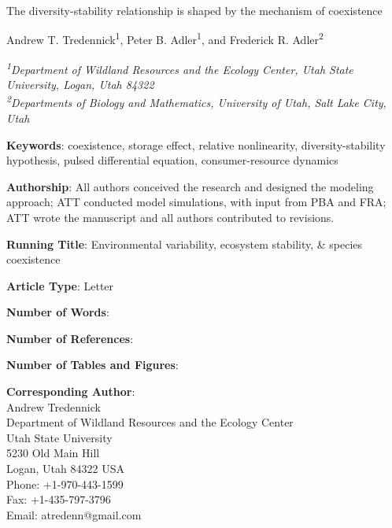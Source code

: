 \documentclass[12pt,]{article}
\title{}
\author{}
\date{}
\begin{document}
\maketitle


\renewcommand\linenumberfont{\normalfont\tiny\sffamily\color{gray}}

\begin{singlespace}

\begin{centering}

\Large{The diversity-stability relationship is shaped by the mechanism of coexistence}

\vspace{2.5em}

\renewcommand*{\thefootnote}{\fnsymbol{footnote}}

\normalsize{Andrew T. Tredennick\textsuperscript{1}, Peter B. Adler\textsuperscript{1}, and Frederick R. Adler\textsuperscript{2}}

\vspace{1.5em}

\textit{\small{\textsuperscript{1}Department of Wildland Resources and the Ecology Center, Utah State University, Logan, Utah 84322}} \\
\textit{\small{\textsuperscript{2}Departments of Biology and Mathematics, University of Utah, Salt Lake City, Utah}} 

\end{centering}

\vspace{3em}

\noindent \textbf{Keywords}: coexistence, storage effect, relative nonlinearity, diversity-stability hypothesis, pulsed differential equation, consumer-resource dynamics

\noindent \textbf{Authorship}: All authors conceived the research and designed the modeling approach; ATT conducted model simulations, with input from PBA and FRA; ATT wrote the manuscript and all authors contributed to revisions.

\noindent \textbf{Running Title}: Environmental variability, ecosystem stability, \& species coexistence

\noindent \textbf{Article Type}: Letter

\noindent \textbf{Number of Words}:

\noindent \textbf{Number of References}:

\noindent \textbf{Number of Tables and Figures}:

\noindent \textbf{Corresponding Author}:  \\
Andrew Tredennick  \\
Department of Wildland Resources and the Ecology Center  \\
Utah State University  \\
5230 Old Main Hill  \\
Logan, Utah 84322 USA  \\
Phone: +1-970-443-1599  \\
Fax: +1-435-797-3796  \\
Email: atredenn@gmail.com

\end{singlespace}
\end{document}
